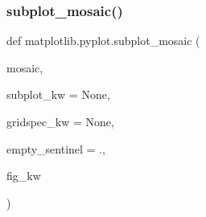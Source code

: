 \subsubsection{\texorpdfstring{subplot\+\_\+mosaic()}{subplot\_mosaic()}}
{\footnotesize\ttfamily def matplotlib.\+pyplot.\+subplot\+\_\+mosaic (\begin{DoxyParamCaption}\item[{}]{mosaic,  }\item[{}]{subplot\+\_\+kw = {\ttfamily None},  }\item[{}]{gridspec\+\_\+kw = {\ttfamily None},  }\item[{}]{empty\+\_\+sentinel = {\ttfamily \textquotesingle{}.\textquotesingle{}},  }\item[{}]{fig\+\_\+kw }\end{DoxyParamCaption})}


